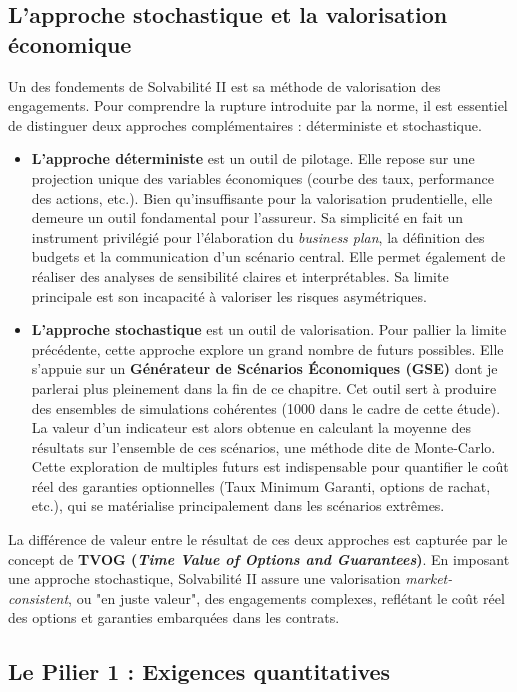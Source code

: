 \subsection{L'approche stochastique et la valorisation économique}

Un des fondements de Solvabilité II est sa méthode de valorisation des engagements. Pour comprendre la rupture introduite par la norme, il est essentiel de distinguer deux approches complémentaires : déterministe et stochastique.

\begin{itemize}
    \item \textbf{L'approche déterministe} est un outil de pilotage. Elle repose sur une projection unique des variables économiques (courbe des taux, performance des actions, etc.). Bien qu'insuffisante pour la valorisation prudentielle, elle demeure un outil fondamental pour l'assureur. Sa simplicité en fait un instrument privilégié pour l'élaboration du \textit{business plan}, la définition des budgets et la communication d'un scénario central. Elle permet également de réaliser des analyses de sensibilité claires et interprétables. Sa limite principale est son incapacité à valoriser les risques asymétriques.

    \item \textbf{L'approche stochastique} est un outil de valorisation. Pour pallier la limite précédente, cette approche explore un grand nombre de futurs possibles. Elle s'appuie sur un \textbf{Générateur de Scénarios Économiques (GSE)} dont je parlerai plus pleinement dans la fin de ce chapitre. Cet outil sert à produire des ensembles de simulations cohérentes (1000 dans le cadre de cette étude). La valeur d'un indicateur est alors obtenue en calculant la moyenne des résultats sur l'ensemble de ces scénarios, une méthode dite de Monte-Carlo. Cette exploration de multiples futurs est indispensable pour quantifier le coût réel des garanties optionnelles (Taux Minimum Garanti, options de rachat, etc.), qui se matérialise principalement dans les scénarios extrêmes.
\end{itemize}

La différence de valeur entre le résultat de ces deux approches est capturée par le concept de \textbf{TVOG (\textit{Time Value of Options and Guarantees})}. En imposant une approche stochastique, Solvabilité II assure une valorisation \textit{market-consistent}, ou "en juste valeur", des engagements complexes, reflétant le coût réel des options et garanties embarquées dans les contrats.
\subsection{Le Pilier 1 : Exigences quantitatives}


